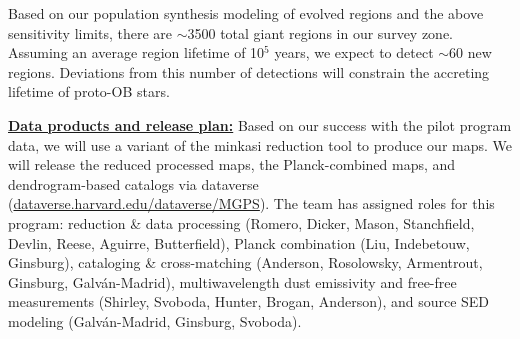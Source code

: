 \documentclass[11pt,preprint]{aastex_nofoot}
\newcommand{\MUSTANG}{\textsc{MUSTANG-2}\xspace}
\begin{document}
Based on our population synthesis modeling of evolved \hii regions and the
above sensitivity limits, there are $\sim$3500 total giant \hii
regions in our survey zone. Assuming an average \hchii region
lifetime of 10$^{5}$ years, we expect to detect $\sim$60 new \hchii
regions. Deviations from this number of detections will constrain
the accreting lifetime of proto-OB stars.


\indent\underline{\textbf{\helv Data products and release plan:}}
Based on our success with the pilot program data, we will use a variant of the
minkasi reduction tool to produce our maps.  We will release the reduced
processed maps, the Planck-combined maps, and dendrogram-based catalogs via
dataverse (\url{dataverse.harvard.edu/dataverse/MGPS}).  The team has assigned
roles for this program: reduction \& data processing (Romero, Dicker, Mason,
Stanchfield, Devlin, Reese, Aguirre, Butterfield), Planck combination (Liu,
Indebetouw, Ginsburg),  cataloging \& cross-matching (Anderson, Rosolowsky,
Armentrout, Ginsburg, Galv{\'a}n-Madrid), multiwavelength dust emissivity
and free-free measurements (Shirley, Svoboda, Hunter, Brogan, Anderson),
and source SED modeling (Galv{\'a}n-Madrid, Ginsburg, Svoboda).




\end{document}
